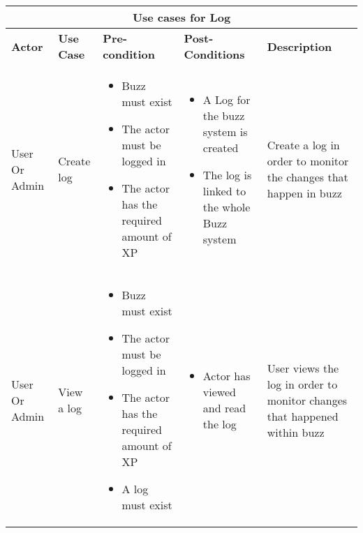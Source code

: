 \documentclass{report}
\begin{document}
	
		\begin{longtable}{@{}|p{1.5cm}|p{2.2cm}|p{3cm}|p{3.5cm}|p{3.5cm}|@{}}
			\toprule
			\multicolumn{5}{|c|}{\textbf{Use cases for Log}}\\
			\hline
			\textbf{Actor} & \textbf{Use Case} & \textbf{Pre-condition} & \textbf{Post-Conditions} & \textbf{Description} \\ \midrule
			
			User Or Admin& 
			Create log& 
			\begin{itemize}
				\item Buzz must exist
				\item The actor must be logged in
				\item The actor has the required amount of XP
			\end{itemize}& 
			\begin{itemize}
				\item A Log for the buzz system is created
				\item The log is linked to the whole Buzz system
			\end{itemize} & 
			Create a log in order to monitor the changes that happen in buzz \\ \midrule
			
			User Or Admin& 
			 View a log& 
			\begin{itemize}
				\item Buzz must exist
				\item The actor must be logged in
				\item The actor has the required amount of XP
				\item A log must exist
			\end{itemize}& 
			\begin{itemize}
				\item Actor has viewed and read the log
			\end{itemize} & 
			User views the log in order to monitor changes that happened within buzz \\ \midrule
			
		\end{longtable}
\end{document}
